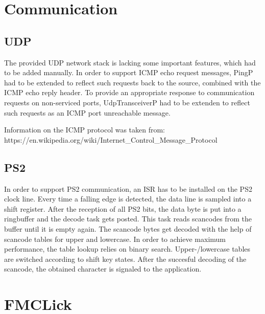 \documentclass[12pt,a4paper,titlepage,oneside]{article}
\begin{document}
\section{Communication}

\subsection{UDP}

The provided UDP network stack is lacking some important features, which had
to be added manually. In order to support ICMP echo request messages, PingP
had to be extended to reflect such requests back to the source, combined with
the ICMP echo reply header. To provide an appropriate response to communication
requests on non-serviced ports, UdpTransceiverP had to be extenden to reflect
such requests as an ICMP port unreachable message.

Information on the ICMP protocol was taken from: https://en.wikipedia.org/wiki/Internet\_Control\_Message\_Protocol

\subsection{PS2}

In order to support PS2 communication, an ISR has to be installed on the PS2
clock line. Every time a falling edge is detected, the data line is sampled
into a shift register. After the reception of all PS2 bits, the data byte is
put into a ringbuffer and the decode task gets posted. This task reads scancodes
from the buffer until it is empty again. The scancode bytes get
decoded with the help of scancode tables for upper and lowercase. In order
to achieve maximum performance, the table lookup relies on binary search.
Upper-/lowercase tables are switched according to shift key states. After
the succesful decoding of the scancode, the obtained character is signaled
to the application.

\section{FMCLick}
\end{document}
